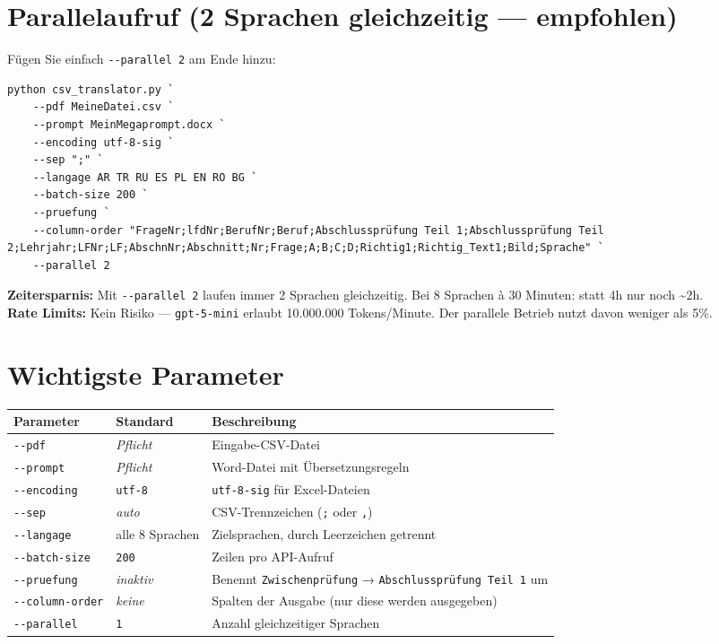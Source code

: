 \documentclass[a4paper,11pt]{article}
\newenvironment{erfolgbox}{%
  \begin{mdframed}[backgroundcolor=erfolg,linecolor=erfolgrand,linewidth=1pt,
    innerleftmargin=8pt,innerrightmargin=8pt,innertopmargin=5pt,innerbottommargin=5pt]
  \small}{\end{mdframed}}
\begin{document}
\section{Parallelaufruf (2 Sprachen gleichzeitig — empfohlen)}

Fügen Sie einfach \texttt{-{}-parallel 2} am Ende hinzu:

\begin{lstlisting}
python csv_translator.py `
    --pdf MeineDatei.csv `
    --prompt MeinMegaprompt.docx `
    --encoding utf-8-sig `
    --sep ";" `
    --langage AR TR RU ES PL EN RO BG `
    --batch-size 200 `
    --pruefung `
    --column-order "FrageNr;lfdNr;BerufNr;Beruf;Abschlussprüfung Teil 1;Abschlussprüfung Teil 2;Lehrjahr;LFNr;LF;AbschnNr;Abschnitt;Nr;Frage;A;B;C;D;Richtig1;Richtig_Text1;Bild;Sprache" `
    --parallel 2
\end{lstlisting}

\begin{erfolgbox}
\textbf{Zeitersparnis:} Mit \texttt{-{}-parallel 2} laufen immer 2 Sprachen gleichzeitig.
Bei 8 Sprachen à 30 Minuten: statt 4h nur noch \textasciitilde2h.\\[3pt]
\textbf{Rate Limits:} Kein Risiko — \texttt{gpt-5-mini} erlaubt 10.000.000 Tokens/Minute.
Der parallele Betrieb nutzt davon weniger als 5\%.
\end{erfolgbox}

\section{Wichtigste Parameter}

\begin{tabularx}{\textwidth}{@{}l l X@{}}
\toprule
\textbf{Parameter} & \textbf{Standard} & \textbf{Beschreibung} \\
\midrule
\texttt{-{}-pdf} & \textit{Pflicht} & Eingabe-CSV-Datei \\[3pt]
\texttt{-{}-prompt} & \textit{Pflicht} & Word-Datei mit Übersetzungsregeln \\[3pt]
\texttt{-{}-encoding} & \texttt{utf-8} & \texttt{utf-8-sig} für Excel-Dateien \\[3pt]
\texttt{-{}-sep} & \textit{auto} & CSV-Trennzeichen (\texttt{;} oder \texttt{,}) \\[3pt]
\texttt{-{}-langage} & alle 8 Sprachen & Zielsprachen, durch Leerzeichen getrennt \\[3pt]
\texttt{-{}-batch-size} & \texttt{200} & Zeilen pro API-Aufruf \\[3pt]
\texttt{-{}-pruefung} & \textit{inaktiv} & Benennt \texttt{Zwischenprüfung} → \texttt{Abschlussprüfung Teil 1} um \\[3pt]
\texttt{-{}-column-order} & \textit{keine} & Spalten der Ausgabe (nur diese werden ausgegeben) \\[3pt]
\texttt{-{}-parallel} & \texttt{1} & Anzahl gleichzeitiger Sprachen \\
\bottomrule
\end{tabularx}
\end{document}
